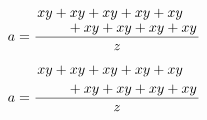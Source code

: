 \documentclass[12pt,openany]{book} %
\begin{document}


\pagestyle{empty} %
\tableofcontents %

\cleardoublepage %

\pagestyle{fancy} %









\begin{codeshow}
	\[
	a=\frac{
		\splitfrac{xy + xy + xy + xy + xy}
		{+ xy + xy + xy + xy}
	}
	{z}
	\]
\end{codeshow}
\begin{codeshow}
	\[
	a=\frac{
		\splitdfrac{xy + xy + xy + xy + xy}
		{+ xy + xy + xy + xy}
	}
	{z}
	\]
\end{codeshow}

\cleardoublepage
{}
\setlength{\columnsep}{0.75cm}
\printindex
\end{document}
